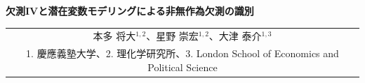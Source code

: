 \documentclass[a4paper,10pt]{article}
\newcommand{\papertitle}{欠測IVと潜在変数モデリングによる非無作為欠測の識別}
\newcommand{\authorblock}{%
  \begin{tabular}{c}
    本多 将大\(^{1,2}\)、星野 崇宏\(^{1,2}\)、大津 泰介\(^{1,3}\)\\[-0.1mm]
    {\scriptsize 1. 慶應義塾大学、2. 理化学研究所、3. London School of Economics and Political Science}
  \end{tabular}
}
\begin{document}
\begin{center}
  {\LARGE\bfseries \papertitle\par}
  \vspace{2mm}
  {\normalsize \authorblock}
\end{center}
\vspace{3mm}

\begin{abstract}
多次元の測定項目がmissing not at random (MNAR)で欠測するとき，観測変数の
full-data lawを回復するだけでは，その背後にある潜在クラス比率と測定核は一般に
分離されない。本稿は，第一段階でshadow instrumental variableとblockwise
complete-case completenessを用いて各supported-block lawを回復し，第二段階で
overlapping block lawsをanchor itemsとlatent shifterにより接続する。有限潜在クラス
モデルについて，Kruskal型rank条件の下で潜在クラス比率と全測定核を共通labelの
下で識別し，global complete caseを必要としないbridge-weighted composite estimatorを
構成する。有限次元bridgeに対する一致性と漸近正規性を示し，simulationでは，提案法が
parametric selection modelの誤指定に伴うbiasを抑えながら潜在測定核を回復することを確認する。

\noindent\textbf{Keywords:} MNAR; shadow variable; completeness; latent class;
tensor decomposition; instrumental variable
\end{abstract}
\end{document}
